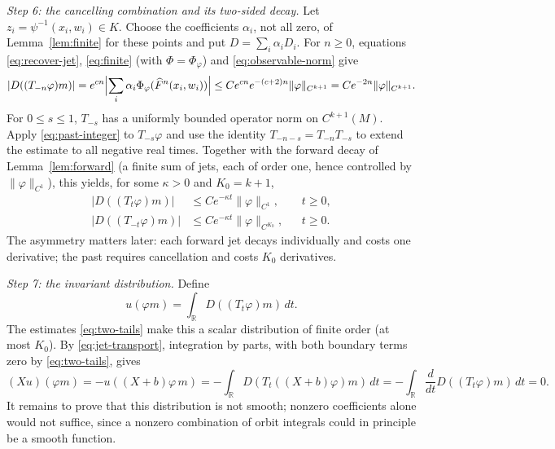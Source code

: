 \documentclass[11pt]{article}
\theoremstyle{remark}
\newcommand{\R}{\mathbb R}
\begin{document}
\emph{Step 6: the cancelling combination and its two-sided decay.}
Let \(z_i=\psi^{-1}(x_i,w_i)\in K\).
Choose the coefficients \(\alpha_i\), not all zero, of
Lemma~\ref{lem:finite} for these points and put \(D=\sum_i\alpha_iD_i\).
For \(n\ge0\), equations \eqref{eq:recover-jet}, \eqref{eq:finite}
(with \(\Phi=\Phi_\varphi\)) and \eqref{eq:observable-norm} give
\begin{equation}\label{eq:past-integer}
 |D((T_{-n}\varphi)m)|
  =e^{cn}\Bigl|\sum_i\alpha_i\Phi_\varphi(\widehat F^n(x_i,w_i))\Bigr|
  \le C e^{cn}e^{-(c+2)n}\|\varphi\|_{C^{k+1}}
  =Ce^{-2n}\|\varphi\|_{C^{k+1}}.
\end{equation}
For \(0\le s\le1\), \(T_{-s}\) has a uniformly bounded operator norm
on \(C^{k+1}(M)\).
Apply \eqref{eq:past-integer} to \(T_{-s}\varphi\) and use the
identity \(T_{-n-s}=T_{-n}T_{-s}\) to extend the estimate to all
negative real times.
Together with the forward decay of Lemma~\ref{lem:forward} (a finite
sum of jets, each of order one, hence controlled by
\(\|\varphi\|_{C^1}\)), this yields, for some \(\kappa>0\)
and \(K_0=k+1\),
\begin{equation}\label{eq:two-tails}
 \begin{aligned}
 |D((T_t\varphi)m)|&\le Ce^{-\kappa t}\|\varphi\|_{C^1},
                                      &&t\ge0,\\
 |D((T_{-t}\varphi)m)|&\le Ce^{-\kappa t}\|\varphi\|_{C^{K_0}},
                                      &&t\ge0.
 \end{aligned}
\end{equation}
The asymmetry matters later: each forward jet decays individually
and costs one derivative; the past requires cancellation and costs
\(K_0\) derivatives.

\emph{Step 7: the invariant distribution.}
Define
\begin{equation}\label{eq:invariant-u}
 u(\varphi m)=\int_{\R}D((T_t\varphi)m)\,dt.
\end{equation}
The estimates \eqref{eq:two-tails} make this a scalar distribution of
finite order (at most \(K_0\)).
By \eqref{eq:jet-transport}, integration by parts, with both boundary
terms zero by \eqref{eq:two-tails}, gives
\begin{equation}\label{eq:Xu-zero}
 (Xu)(\varphi m)
  =-u((X+b)\varphi\,m)
  =-\int_{\R}D(T_t((X+b)\varphi)m)\,dt
  =-\int_{\R}\frac{d}{dt}D((T_t\varphi)m)\,dt=0.
\end{equation}
It remains to prove that this distribution is not smooth; nonzero
coefficients alone would not suffice, since a nonzero combination of
orbit integrals could in principle be a smooth function.
\end{document}
